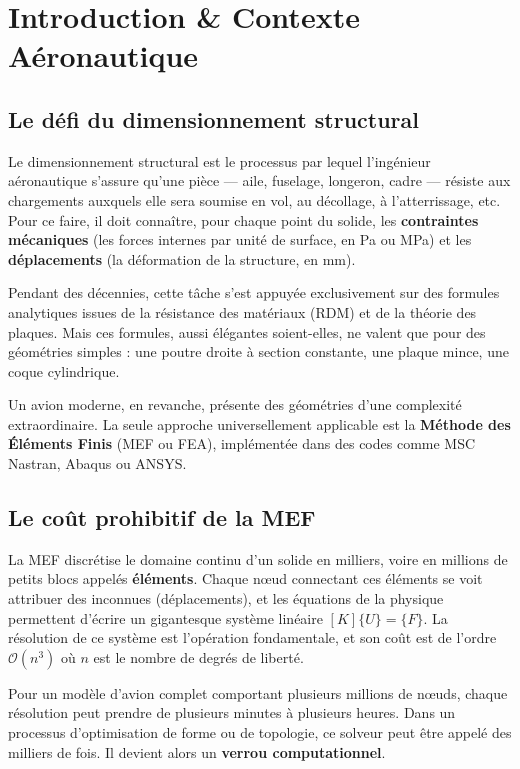 \documentclass[journal, a4paper, twocolumn]{IEEEtran}
\begin{document}
\section{Introduction \& Contexte Aéronautique}

\subsection{Le défi du dimensionnement structural}
Le dimensionnement structural est le processus par lequel l'ingénieur aéronautique s'assure qu'une pièce --- aile, fuselage, longeron, cadre --- résiste aux chargements auxquels elle sera soumise en vol, au décollage, à l'atterrissage, etc. Pour ce faire, il doit connaître, pour chaque point du solide, les \textbf{contraintes mécaniques} (les forces internes par unité de surface, en Pa ou MPa) et les \textbf{déplacements} (la déformation de la structure, en mm).

Pendant des décennies, cette tâche s'est appuyée exclusivement sur des formules analytiques issues de la résistance des matériaux (RDM) et de la théorie des plaques. Mais ces formules, aussi élégantes soient-elles, ne valent que pour des géométries simples : une poutre droite à section constante, une plaque mince, une coque cylindrique.

Un avion moderne, en revanche, présente des géométries d'une complexité extraordinaire. La seule approche universellement applicable est la \textbf{Méthode des Éléments Finis} (MEF ou FEA), implémentée dans des codes comme MSC Nastran, Abaqus ou ANSYS.

\subsection{Le coût prohibitif de la MEF}
La MEF discrétise le domaine continu d'un solide en milliers, voire en millions de petits blocs appelés \textbf{éléments}. Chaque nœud connectant ces éléments se voit attribuer des inconnues (déplacements), et les équations de la physique permettent d'écrire un gigantesque système linéaire $[K]\{U\} = \{F\}$. La résolution de ce système est l'opération fondamentale, et son coût est de l'ordre $\mathcal{O}(n^3)$ où $n$ est le nombre de degrés de liberté.

Pour un modèle d'avion complet comportant plusieurs millions de nœuds, chaque résolution peut prendre de plusieurs minutes à plusieurs heures. Dans un processus d'optimisation de forme ou de topologie, ce solveur peut être appelé des milliers de fois. Il devient alors un \textbf{verrou computationnel}.
\end{document}
